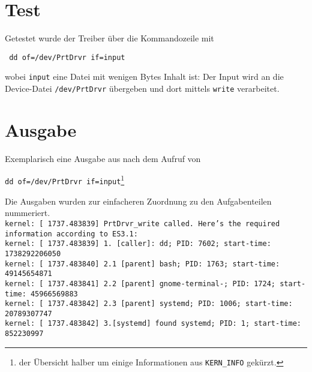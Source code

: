 \section{Test}

\noindent
Getestet wurde der Treiber über die Kommandozeile mit

\begin{center}
\texttt{
dd of=/dev/PrtDrvr if=input
}
\end{center}

\noindent
wobei \texttt{input} eine Datei mit wenigen Bytes Inhalt ist:
Der Input wird an die Device-Datei \texttt{/dev/PrtDrvr} übergeben und dort mittels \texttt{write} verarbeitet.


\section{Ausgabe}
Exemplarisch eine Ausgabe aus  nach dem Aufruf von

\begin{center}
    \texttt{dd of=/dev/PrtDrvr if=input}\footnote{
der Übersicht halber um einige Informationen aus \texttt{KERN\_INFO} gekürzt.
}
\end{center}
Die Ausgaben wurden zur einfacheren Zuordnung zu den Aufgabenteilen nummeriert.\\


\noindent
\texttt{kernel: [ 1737.483839] PrtDrvr\_write called. Here's the required  information according to ES3.1:\\
kernel: [ 1737.483839] 1. [caller]: dd; PID: 7602; start-time: 1738292206050\\
kernel: [ 1737.483840]     2.1 [parent] bash; PID: 1763; start-time: 49145654871\\
kernel: [ 1737.483841]     2.2 [parent] gnome-terminal-; PID: 1724; start-time: 45966569883\\
kernel: [ 1737.483842]     2.3 [parent] systemd; PID: 1006; start-time: 20789307747\\
kernel: [ 1737.483842] 3.[systemd] found systemd; PID: 1; start-time: 852230997\\
}
